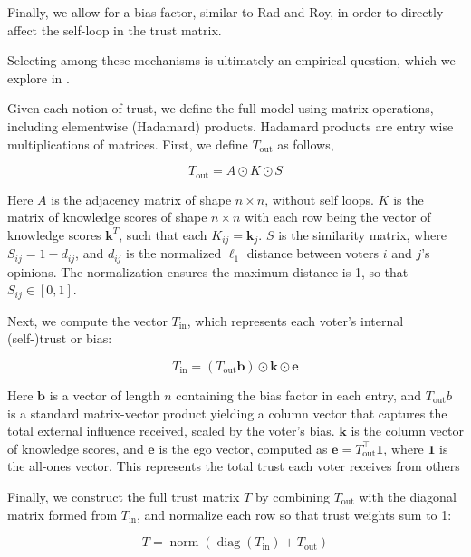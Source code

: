 Finally, we allow for a bias factor, similar to Rad and Roy, in order to
directly affect the self-loop in the trust matrix.

Selecting among these mechanisms is ultimately an empirical question, which we explore in .

Given each notion of trust, we define the full model using matrix operations,
including elementwise (Hadamard) products. Hadamard products are entry wise
multiplications of matrices. First, we define $T_{\text{out}}$ as follows,

\begin{equation}
	T_{\text{out}} = A \odot  K \odot S
	\label{eq:mat_out_trust}
\end{equation}

Here $A$ is the adjacency matrix of shape $n \times n$, without self loops. $K$
is the matrix of knowledge scores of shape $n \times n$ with each row being
the vector of knowledge scores $\boldsymbol{k}^T$, such that each $K_{ij} =
	\boldsymbol{k}_j$. $S$ is the similarity matrix, where $S_{ij} = 1 - d_{ij}$,
and $d_{ij}$ is the normalized $\ell_1$ distance between voters $i$ and $j$’s
opinions. The normalization ensures the maximum distance is 1, so that $S_{ij}
	\in [0, 1]$.

Next, we compute the vector $T_{\text{in}}$, which represents each voter’s internal (self-)trust or bias:

\begin{equation}
	T_{\text{in}} = (T_{\text{out}} \boldsymbol{b}) \odot \boldsymbol{k} \odot \boldsymbol{e}
	\label{eq:in_trust}
\end{equation}

Here $\boldsymbol{b}$ is a vector of length $n$ containing the bias factor in each entry,
and $T_{\text{out}} b$ is a standard matrix-vector product yielding a column
vector that captures the total external influence received, scaled by the
voter's bias. $\boldsymbol{k}$ is the column vector of knowledge scores, and
$\boldsymbol{e}$ is the ego vector, computed as $\boldsymbol{e} = T_{\text{out}}^\top
	\boldsymbol{1}$, where $\boldsymbol{1}$ is the all-ones vector. This represents
the total trust each voter receives from others


Finally, we construct the full trust matrix $T$ by combining $T_{\text{out}}$ with the diagonal matrix formed from $T_{\text{in}}$, and normalize each row so that trust weights sum to 1:


\begin{equation}
	T = \operatorname{norm}\left(\operatorname{diag}(T_{\text{in}}) + T_{\text{out}}\right)
	\label{eq:final_trust}
\end{equation}

